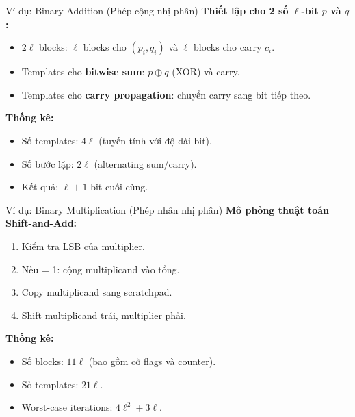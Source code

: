 \begin{frame}{Ví dụ: Binary Addition (Phép cộng nhị phân)}
  \textbf{Thiết lập cho 2 số $\ell$-bit $p$ và $q$:}
  \begin{itemize}
    \item $2\ell$ blocks: $\ell$ blocks cho $(p_i, q_i)$ và $\ell$ blocks cho carry $c_i$.
    \item Templates cho \textbf{bitwise sum}: $p \oplus q$ (XOR) và carry.
    \item Templates cho \textbf{carry propagation}: chuyển carry sang bit tiếp theo.
  \end{itemize}

  \vspace{0.3cm}
  \textbf{Thống kê:}
  \begin{itemize}
    \item Số templates: $4\ell$ (tuyến tính với độ dài bit).
    \item Số bước lặp: $2\ell$ (alternating sum/carry).
    \item Kết quả: $\ell+1$ bit cuối cùng.
  \end{itemize}
\end{frame}

\begin{frame}{Ví dụ: Binary Multiplication (Phép nhân nhị phân)}
  \textbf{Mô phỏng thuật toán Shift-and-Add:}
  \begin{enumerate}
    \item Kiểm tra LSB của multiplier.
    \item Nếu = 1: cộng multiplicand vào tổng.
    \item Copy multiplicand sang scratchpad.
    \item Shift multiplicand trái, multiplier phải.
  \end{enumerate}

  \vspace{0.3cm}
  \textbf{Thống kê:}
  \begin{itemize}
    \item Số blocks: $11\ell$ (bao gồm cờ flags và counter).
    \item Số templates: $21\ell$.
    \item Worst-case iterations: $4\ell^2 + 3\ell$.
  \end{itemize}
\end{frame}
